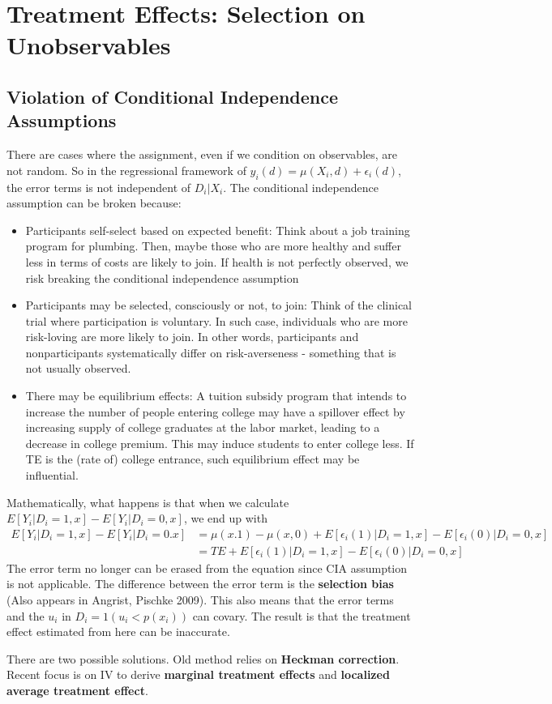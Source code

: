 \chapter{Treatment Effects: Selection on Unobservables}
\section{Violation of Conditional Independence Assumptions}
There are cases where the assignment, even if we condition on observables, are not random. So in the regressional framework of $y_{i}(d)=\mu(X_i,d)+\epsilon_i(d)$, the error terms is not independent of $D_i|X_i$. The conditional independence assumption can be broken because:
\begin{itemize}
\item Participants self-select based on expected benefit: Think about a job training program for plumbing. Then, maybe those who are more healthy and suffer less in terms of costs are likely to join. If health is not perfectly observed, we risk breaking the conditional independence assumption
\item Participants may be selected, consciously or not, to join: Think of the clinical trial where participation is voluntary. In such case, individuals who are more risk-loving are more likely to join. In other words, participants and nonparticipants systematically differ on risk-averseness - something that is not usually observed.
\item There may be equilibrium effects: A tuition subsidy program that intends to increase the number of people entering college may have a spillover effect by increasing supply of college graduates at the labor market, leading to a decrease in college premium. This may induce students to enter college less. If TE is the (rate of) college entrance, such equilibrium effect may be influential.  
\end{itemize}
\par
Mathematically, what happens is that when we calculate $E[Y_i|D_i=1,x]-E[Y_i|D_i=0,x]$, we end up with
\begin{align*}
E[Y_i|D_i=1,x]-E[Y_i|D_i=0.x]&=\mu(x.1)-\mu(x,0)+E[\epsilon_i(1)|D_i=1,x]-E[\epsilon_i(0)|D_i=0,x]\\
&=TE+E[\epsilon_i(1)|D_i=1,x]-E[\epsilon_i(0)|D_i=0,x]
\end{align*}
The error term no longer can be erased from the equation since CIA assumption is not applicable. The difference between the error term is the \textbf{selection bias} (Also appears in Angrist, Pischke 2009). This also means that the error terms and the $u_i$ in $D_i=1(u_i<p(x_i))$ can covary. The result is that the treatment effect estimated from here can be inaccurate. \par
There are two possible solutions. Old method relies on \textbf{Heckman correction}. Recent focus is on IV to derive \textbf{marginal treatment effects} and \textbf{localized average treatment effect}.
